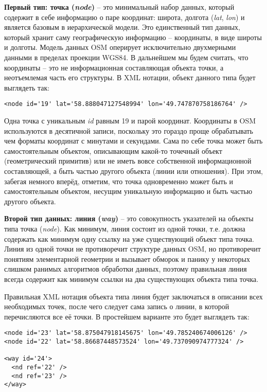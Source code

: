 \textbf{Первый тип: точка (\emph{node})} -- это минимальный набор данных, 
который содержит в себе информацию о паре координат: широта, долгота 
(\emph{lat}, \emph{lon}) и является базовым в иерархической модели. Это 
единственный тип данных, который хранит саму географическую информацию -- 
координаты, в виде широты и долготы. Модель данных OSM оперирует исключительно 
двухмерными данными в пределах проекции WGS84. В дальнейшем мы будем считать, 
что координаты -- это не информационная составляющая объекта точки, а 
неотъемлемая часть его структуры. В XML нотации, объект данного типа будет 
выглядеть так:

\begin{verbatim}
<node id='19' lat='58.888047127548994' lon='49.747870758186764' />
\end{verbatim} %

Одна точка с уникальным \emph{id} равным 19 и парой координат. Координаты в 
OSM используются в десятичной записи, поскольку это гораздо проще обрабатывать 
чем форматы координат с минутами и секундами. Сама по себе точка может быть 
самостоятельным объектом, описывающим какой-то точечный объект (геометрический 
примитив) или не иметь вовсе собственной информационной составляющей, а быть 
частью другого объекта (линии или отношения). При этом, забегая немного 
вперёд, отметим, что точка одновременно может быть и самостоятельным объектом, 
несущим уникальную информацию и быть частью другого объекта.

\textbf{Второй тип данных: линия (\emph{way})} -- это совокупность указателей 
на объекты типа точка (\emph{node}). Как минимум, линия состоит из одной 
точки, т.е. должна содержать как минимум одну ссылку на уже существующий 
объект типа точка. Линия из одной точки не противоречит структуре данных OSM, 
но противоречит понятиям элементарной геометрии и вызывает обморок и панику у 
некоторых слишком ранимых алгоритмов обработки данных, поэтому правильная 
линия всегда содержит как минимум ссылки на два существующих объекта типа 
точка.

Правильная XML нотация объекта типа линия будет заключаться в описании всех 
необходимых точек, после чего следует сама запись о линии, в которой 
перечисляются все её точки. В простейшем варианте это будет выглядеть так:

\begin{verbatim}
<node id='23' lat='58.875047918145675' lon='49.785240674006126' />
<node id='22' lat='58.86687448573524' lon='49.737090974777324' />

<way id='24'>
  <nd ref='22' />
  <nd ref='23' />
</way>
\end{verbatim}

